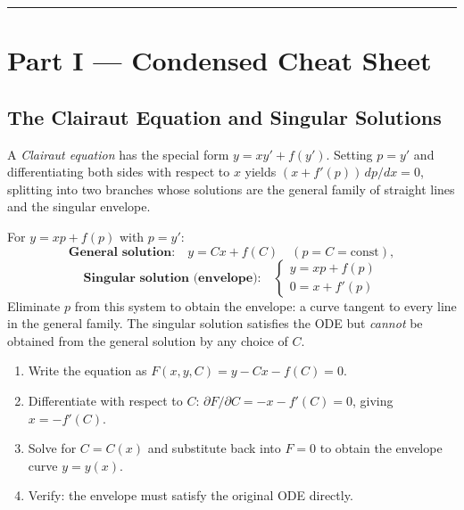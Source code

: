 \vspace{0.6em}
\hrule
\vspace{0.6em}

{}
\section*{Part I --- Condensed Cheat Sheet}
\setcounter{section}{8}   %

\subsection{The Clairaut Equation and Singular Solutions}

A \emph{Clairaut equation} has the special form $y = xy' + f(y')$.
Setting $p = y'$ and differentiating both sides with respect to $x$ yields
$(x + f'(p))\,dp/dx = 0$, splitting into two branches whose solutions are
the general family of straight lines and the singular envelope.

\begin{formulabox}
For $y = xp + f(p)$ with $p = y'$:
\[
  \textbf{General solution:}\quad y = Cx + f(C) \quad (p = C = \text{const}),
\]
\[
  \textbf{Singular solution (envelope):}\quad
  \begin{cases}
    y = xp + f(p) \\
    0 = x + f'(p)
  \end{cases}
\]
Eliminate $p$ from this system to obtain the envelope: a curve tangent to every
line in the general family.
The singular solution satisfies the ODE but \emph{cannot} be obtained from the
general solution by any choice of $C$.
\end{formulabox}

\begin{methodbox}
\begin{enumerate}[leftmargin=1.6em, itemsep=3pt]
  \item Write the equation as $F(x,y,C) = y - Cx - f(C) = 0$.
  \item Differentiate with respect to $C$: $\partial F/\partial C = -x - f'(C) = 0$,
        giving $x = -f'(C)$.
  \item Solve for $C = C(x)$ and substitute back into $F = 0$ to obtain the
        envelope curve $y = y(x)$.
  \item Verify: the envelope must satisfy the original ODE directly.
\end{enumerate}
\end{methodbox}


